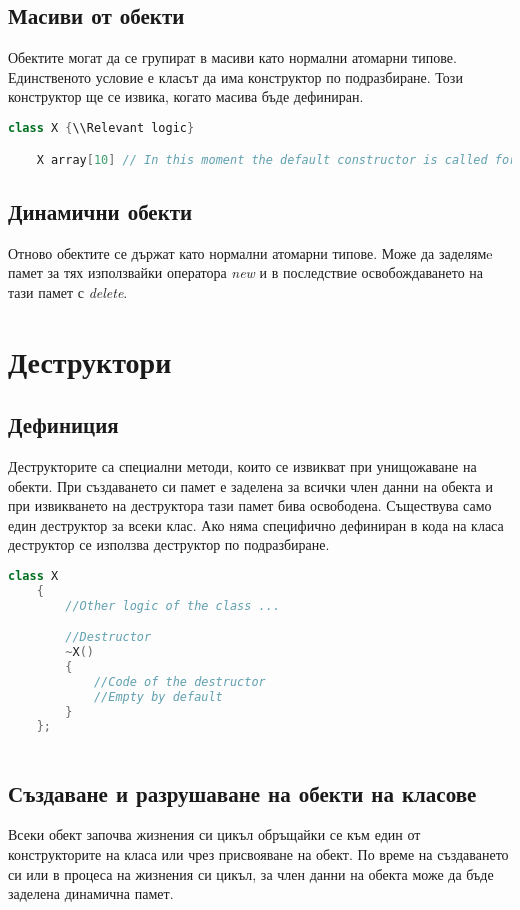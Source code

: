 \documentclass[fleqn,12pt]{article}
\begin{document}
\subsection{Масиви от обекти}
Обектите могат да се групират в масиви като нормални атомарни типове. Единственото условие е класът да има конструктор по подразбиране. Този конструктор ще се извика, когато масива бъде дефиниран.

\begin{lstlisting}[language=C++, caption=Example creation of an array of objects]
    class X {\\Relevant logic}

    X array[10] // In this moment the default constructor is called for the 10 elements created.
\end{lstlisting}


\subsection{Динамични обекти}
Отново обектите се държат като нормални атомарни типове. Може да заделямe памет за тях използвайки оператора \textit{new} и в последствие освобождаването на тази памет с \textit{delete}.


\section{Деструктори}
\subsection{Дефиниция}
Деструкторите са специални методи, които се извикват при унищожаване на обекти. При създаването си памет е заделена за всички член данни на обекта и при извикването на деструктора тази памет бива освободена. Съществува само един деструктор за всеки клас. Ако няма специфично дефиниран в кода на класа деструктор се използва деструктор по подразбиране. 

\begin{lstlisting}[language=C++, caption=Example destructor]
    class X
    {
        //Other logic of the class ...

        //Destructor
        ~X()
        {
            //Code of the destructor
            //Empty by default
        }
    };
    
\end{lstlisting}
    

\subsection{Създаване и разрушаване на обекти на класове}
Всеки обект започва жизнения си цикъл обръщайки се към един от конструкторите на класа или чрез присвояване на обект. По време на създаването си или в процеса на жизнения си цикъл, за член данни на обекта може да бъде заделена динамична памет. 
\end{document}
